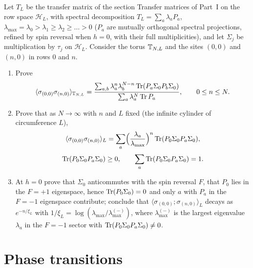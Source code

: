 \begin{exercise}
Let $T_L$ be the transfer matrix of the section Transfer matrices of Part~I
on the row space $\mathcal H_L$, with spectral decomposition
$T_L=\sum_a\lambda_aP_a$, $\lambda_{\max}=\lambda_0>\lambda_1\ge\lambda_2\ge\dots>0$
($P_a$ are mutually orthogonal spectral projections, refined
by spin reversal when $h=0$, with their full multiplicities), and
let $\Sigma_j$ be multiplication by $\tau_j$ on $\mathcal H_L$.  Consider the
torus $\mathbb T_{N,L}$ and the sites $(0,0)$ and $(n,0)$ in rows $0$ and $n$.
\begin{enumerate}[label=(\alph*)]
\item Prove
\[
 \langle\sigma_{(0,0)}\sigma_{(n,0)}\rangle_{\mathbb T_{N,L}}
 =\frac{\sum_{a,b}\lambda_a^{n}\lambda_b^{N-n}\operatorname{Tr}(P_a\Sigma_0P_b\Sigma_0)}{\sum_a\lambda_a^N\operatorname{Tr} P_a},
 \qquad 0\le n\le N .
\]
\item Prove that as $N\to\infty$ with $n$ and $L$ fixed (the infinite
cylinder of circumference $L$),
\[
 \langle\sigma_{(0,0)}\sigma_{(n,0)}\rangle_{L}
 =\sum_{a}\Bigl(\frac{\lambda_a}{\lambda_{\max}}\Bigr)^n\operatorname{Tr}(P_0\Sigma_0P_a\Sigma_0),
 \]
\[
 \operatorname{Tr}(P_0\Sigma_0P_a\Sigma_0)\ge0,\qquad
 \sum_a\operatorname{Tr}(P_0\Sigma_0P_a\Sigma_0)=1 .
\]
\item At $h=0$ prove that $\Sigma_0$ anticommutes with the spin reversal $F$,
that $P_0$ lies in the $F=+1$ eigenspace, hence $\operatorname{Tr}(P_0\Sigma_0)=0$ and only
$a$ with $P_a$ in the $F=-1$ eigenspace contribute; conclude that
$\langle\sigma_{(0,0)};\sigma_{(n,0)}\rangle_L$ decays as
$e^{-n/\xi_L}$ with $1/\xi_L=\log(\lambda_{\max}/\lambda^{(-)}_{\max})$, where
$\lambda^{(-)}_{\max}$ is the largest eigenvalue $\lambda_a$ in the $F=-1$
sector with $\operatorname{Tr}(P_0\Sigma_0P_a\Sigma_0)\ne0$.
\end{enumerate}
\end{exercise}

\section{Phase transitions}

